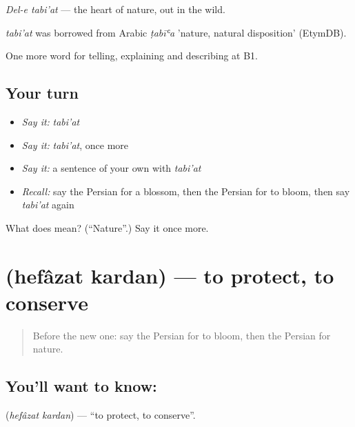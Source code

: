\emph{Del-e tabi'at} — the heart of nature, out in the wild.

\begin{cousinweb}
\emph{tabi'at} was borrowed from Arabic \emph{ṭabīʿa} 'nature, natural disposition' (EtymDB).
\end{cousinweb}

\begin{grammarlens}[title={What you've built}]
One more word for telling, explaining and describing at B1.
\end{grammarlens}

\subsection*{Your turn}
\begin{itemize}
\raggedright
  \item \emph{Say it:} \emph{tabi'at}
  \item \emph{Say it:} \emph{tabi'at}, once more
  \item \emph{Say it:} a sentence of your own with \emph{tabi'at}
  \item \emph{Recall:} say the Persian for a blossom, then the Persian for to bloom, then say \emph{tabi'at} again
\end{itemize}

\begin{tcolorbox}[breakable,colback=teal!4,colframe=teal!35!black,title={Before you move on}]
What does  mean? (\textquotedblleft{}Nature\textquotedblright{}.) Say it once more.
\end{tcolorbox}
\section[\texorpdfstring{\fa{حفاظت} \fa{کردن} (hefâzat kardan)}{حفاظت کردن (hefâzat kardan)}]{  (hefâzat kardan) — to protect, to conserve}

\label{lesson:FA-C472-hefazat-kardan}



\begin{quote}
Before the new one: say the Persian for to bloom, then the Persian for nature.
\end{quote}

\subsection*{You'll want to know:  }
\textbf{ } (\emph{hefâzat kardan}) — \textquotedblleft{}to protect, to conserve\textquotedblright{}.


